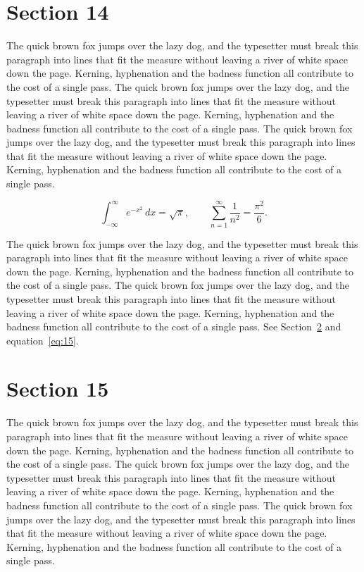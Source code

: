 \documentclass{article}
\begin{document}
\section{Section 14}
\label{sec:14}
The quick brown fox jumps over the lazy dog, and the typesetter must break this paragraph into lines that fit the measure without leaving a river of white space down the page. Kerning, hyphenation and the badness function all contribute to the cost of a single pass. The quick brown fox jumps over the lazy dog, and the typesetter must break this paragraph into lines that fit the measure without leaving a river of white space down the page. Kerning, hyphenation and the badness function all contribute to the cost of a single pass. The quick brown fox jumps over the lazy dog, and the typesetter must break this paragraph into lines that fit the measure without leaving a river of white space down the page. Kerning, hyphenation and the badness function all contribute to the cost of a single pass. 

\begin{equation}\label{eq:14}
\int_{-\infty}^{\infty} e^{-x^{2}}\,dx = \sqrt{\pi}, \qquad
\sum_{n=1}^{\infty} \frac{1}{n^{2}} = \frac{\pi^{2}}{6}.
\end{equation}

The quick brown fox jumps over the lazy dog, and the typesetter must break this paragraph into lines that fit the measure without leaving a river of white space down the page. Kerning, hyphenation and the badness function all contribute to the cost of a single pass. The quick brown fox jumps over the lazy dog, and the typesetter must break this paragraph into lines that fit the measure without leaving a river of white space down the page. Kerning, hyphenation and the badness function all contribute to the cost of a single pass. 
See Section~\ref{sec:15} and equation~\eqref{eq:15}.
\section{Section 15}
\label{sec:15}
The quick brown fox jumps over the lazy dog, and the typesetter must break this paragraph into lines that fit the measure without leaving a river of white space down the page. Kerning, hyphenation and the badness function all contribute to the cost of a single pass. The quick brown fox jumps over the lazy dog, and the typesetter must break this paragraph into lines that fit the measure without leaving a river of white space down the page. Kerning, hyphenation and the badness function all contribute to the cost of a single pass. The quick brown fox jumps over the lazy dog, and the typesetter must break this paragraph into lines that fit the measure without leaving a river of white space down the page. Kerning, hyphenation and the badness function all contribute to the cost of a single pass. 
\end{document}
